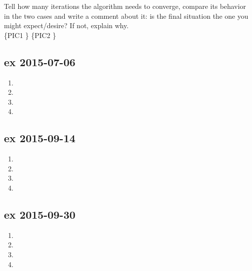 \documentclass[a4paper,12pt,titlepage]{article} %
\begin{document}
Tell how many iterations the algorithm needs to converge, compare its behavior in the two cases and write a comment about it: is the final situation the one you might expect/desire? If not, explain why.\\

\{PIC1 \} \{PIC2 \}

\subsection{ex 2015-07-06}
\begin{enumerate}
\item
\item
\item
\item 
\end{enumerate}

\subsection{ex 2015-09-14}
\begin{enumerate}
\item
\item
\item
\item 
\end{enumerate}

\subsection{ex 2015-09-30}
\begin{enumerate}
\item
\item
\item
\item 
\end{enumerate}

\end{document}
